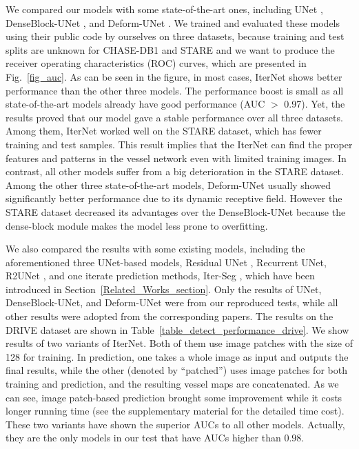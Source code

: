 \documentclass[10pt,twocolumn,letterpaper]{article}
\begin{document}
We compared our models with some state-of-the-art ones, including UNet \cite{UNet}, DenseBlock-UNet \cite{8697107, 8379359}, and Deform-UNet \cite{JIN2019}. We trained and evaluated these models using their public code by ourselves on three datasets, because training and test splits are unknown for CHASE-DB1 and STARE and we want to produce the receiver operating characteristics (ROC) curves, which are presented in Fig.~\ref{fig_auc}. As can be seen in the figure, in most cases, IterNet shows better performance than the other three models. The performance boost is small as all state-of-the-art models already have good performance (AUC $>$ 0.97). Yet, the results proved that our model gave a stable performance over all three datasets. Among them, IterNet worked well on the STARE dataset, which has fewer training and test samples. This result implies that the IterNet can find the proper features and patterns in the vessel network even with limited training images. In contrast, all other models suffer from a big deterioration in the STARE dataset. Among the other three state-of-the-art models, Deform-UNet usually showed significantly better performance due to its dynamic receptive field. However the STARE dataset decreased its advantages over the DenseBlock-UNet because the dense-block module makes the model less prone to overfitting.

We also compared the results with some existing models, including the aforementioned three UNet-based models, Residual UNet \cite{alom2018recurrent}, Recurrent UNet\cite{alom2018recurrent}, R2UNet \cite{alom2018recurrent}, and one iterate prediction methods, \ie Iter-Seg \cite{7042289}, which have been introduced in Section~\ref{Related_Works_section}. Only the results of UNet, DenseBlock-UNet, and Deform-UNet were from our reproduced tests, while all other results were adopted from the corresponding papers. The results on the DRIVE dataset are shown in Table~\ref{table_detect_performance_drive}. We show results of two variants of IterNet. Both of them use image patches with the size of 128 for training. In prediction, one takes a whole image as input and outputs the final results, while the other (denoted by ``patched'') uses image patches for both training and prediction, and the resulting vessel maps are concatenated. As we can see, image patch-based prediction brought some improvement while it costs longer running time (see the supplementary material for the detailed time cost). These two variants have shown the superior AUCs to all other models. Actually, they are the only models in our test that have AUCs higher than $0.98$.
\end{document}

